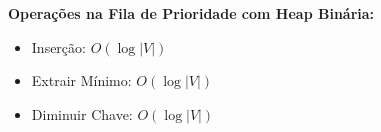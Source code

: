 \documentclass[preview]{standalone}
\begin{document}
\begin{center}
\textbf{Operações na Fila de Prioridade com Heap Binária:}
            \begin{itemize}
                \item Inserção: $O(\log |V|)$
                \item Extrair Mínimo: $O(\log |V|)$
                \item Diminuir Chave: $O(\log |V|)$
            \end{itemize}
\end{center}
\end{document}
